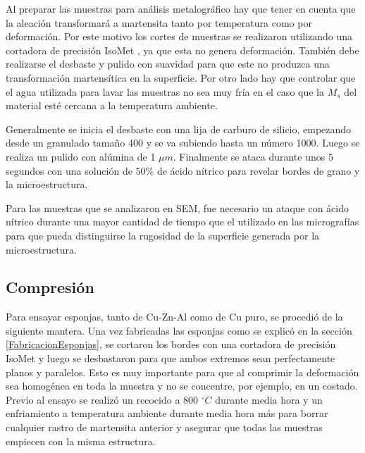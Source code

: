 \documentclass[a4paper,12pt,fleqn,twoside,openany]{book}
\begin{document}
Al preparar las muestras para análisis metalográfico hay que tener en cuenta que la aleación transformará a martensita tanto por temperatura como por deformación. Por este motivo los cortes de muestras se realizaron utilizando una cortadora de precisión IsoMet , ya que esta no genera deformación. También debe realizarse el desbaste y pulido con suavidad para que este no produzca una transformación 
martensítica en la superficie. Por otro lado hay que controlar que el agua utilizada para lavar las muestras no sea muy fría en el caso 
que la $M_s$ del material esté cercana a la temperatura ambiente. 

Generalmente se inicia el desbaste con una lija de carburo de silicio, empezando desde un granulado tamaño 400 y se va subiendo hasta un número 1000. 
Luego se realiza un pulido con alúmina de 1 $\mu m$. Finalmente se ataca durante unos $5$ segundos con una solución de $50 \% $ de ácido nítrico para revelar bordes de grano y la microestructura. 

Para las muestras que se analizaron en SEM, fue necesario un ataque con ácido nítrico durante una mayor cantidad de tiempo que el utilizado en las micrografías para que pueda distinguirse la rugosidad de la superficie generada por la microestructura.

\subsection{Compresión} \label{compresión}



Para ensayar esponjas, tanto de Cu-Zn-Al como de Cu puro, se procedió de la siguiente mantera. Una vez fabricadas las esponjas como se explicó en la sección  \ref{FabricacionEsponjas}, se cortaron los bordes con una cortadora de precisión IsoMet y luego se desbastaron para que ambos extremos sean perfectamente planos y paralelos. Esto es muy importante para que al comprimir la deformación sea homogénea en toda la muestra y no se concentre, por ejemplo, en un costado. Previo al ensayo se realizó un recocido a 800 $^\circ C$ durante media hora y un enfriamiento a temperatura ambiente durante media hora más para borrar cualquier rastro de martensita anterior y asegurar que todas las muestras empiecen con la misma estructura. 
\end{document}

